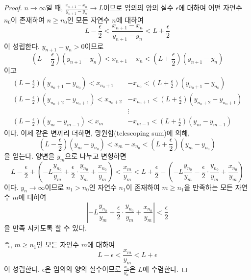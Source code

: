 \documentclass[11pt, a4paper]{book}
\begin{document}
\begin{proof}
$n\to\infty$일 때, $\frac{x_{n+1}-x_{n}}{y_{n+1}-y_{n}}\to L$이므로 임의의 양의 실수 $\epsilon$에 대하여 어떤 자연수 $n_{0}$이 존재하여 $n\ge n_{0}$인 모든 자연수 $n$에 대하여
\begin{equation*}
L-\frac{\epsilon}{2}<\frac{x_{n+1}-x_{n}}{y_{n+1}-y_{n}}< L +\frac{\epsilon}{2}
\end{equation*}
이 성립한다. $y_{n+1}-y_{n}>0$이므로
\begin{equation*}
\left(L-\frac{\epsilon}{2}\right)\left(y_{n+1}-y_{n}\right)< x_{n+1}-x_{n}<\left(L+\frac{\epsilon}{2}\right)\left(y_{n+1}-y_{n}\right)
\end{equation*}
이고
\begin{align*}
	\left(L-\frac{\epsilon}{2}\right)\left(y_{n_{0}+1}-y_{n_{0}}\right) < x_{n_{0}+1}&-x_{n_{0}}<\left(L+\frac{\epsilon}{2}\right)\left(y_{n_{0}+1}-y_{n_{0}}\right)\\
	\left(L-\frac{\epsilon}{2}\right)\left(y_{n_{0}+2}-y_{n_{0}+1}\right)<x_{n_{0}+2}&-x_{n_{0}+1}<\left(L+\frac{\epsilon}{2}\right)\left(y_{n_{0}+2}-y_{n_{0}+1}\right)\\
	&\vdots \\
	\left(L-\frac{\epsilon}{2}\right)\left(y_{m}-y_{m-1}\right)< x_{m}&-x_{m-1}<\left(L+\frac{\epsilon}{2}\right)\left(y_{m}-y_{m-1}\right)
\end{align*}
이다. 이제 같은 변끼리 더하면, 망원합(telescoping sum)에 의해,
\begin{equation*}
	\left(L-\frac{\epsilon}{2}\right)\left(y_{m}-y_{n_{0}}\right)< x_{m}-x_{n_{0}}<\left(L+\frac{\epsilon}{2}\right)\left(y_{m}-y_{n_{0}}\right)
\end{equation*}
을 얻는다. 양변을 $y_{m}$으로 나누고 변형하면
\begin{equation*}
L -\frac{\epsilon}{2}+\left(-L\frac{y_{n_{0}}}{y_{m}}+\frac{\epsilon}{2}\cdot\frac{y_{n_{0}}}{y_{m}}+\frac{x_{n_{0}}}{y_{m}}\right)<\frac{x_{m}}{y_{m}}< L +\frac{\epsilon}{2}+\left(-L\frac{y_{n_{0}}}{y_{m}}-\frac{\epsilon}{2}\cdot\frac{y_{n_{0}}}{y_{m}}+\frac{x_{n_{0}}}{y_{m}}\right)
\end{equation*}
이다. $y_{n}\to\infty$이므로 $n_{1}> n_{0}$인 자연수 $n_{1}$이 존재하여 $m\ge n_{1}$을 만족하는 모든 자연수 $m$에 대하여 
\begin{equation*}
\left | -L\frac{y_{n_{0}}}{y_{m}}+\frac{\epsilon}{2}\cdot\frac{y_{n_{0}}}{y_{m}}+\frac{x_{n_{0}}}{y_{m}}\right | <\frac{\epsilon}{2}
\end{equation*}을 만족 시키도록  할 수 있다.

즉, $m\ge n_{1}$인 모든 자연수 $m$에 대하여
\begin{equation*}
	L-\epsilon <\frac{x_{m}}{y_{m}}< L +\epsilon
\end{equation*}
이 성립한다. $\epsilon$은 임의의 양의 실수이므로 $\frac{x_{n}}{y_{n}}$은 $L$에 수렴한다.
\end{proof}
\end{document}
